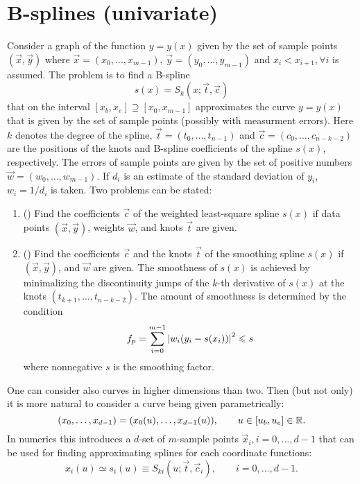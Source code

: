 

\section{B-splines (univariate)}
\label{sec:fitpack}

Consider a graph of the function $y=y(x)$ given by the set of sample
points $(\vec x,\vec y)$ where $\vec x=(x_0,\ldots,x_{m-1})$, $\vec 
y=(y_0,\ldots,y_{m-1})$ and $x_i<x_{i+1}, \forall i$ is assumed.
The problem is to find a B-spline
\begin{displaymath}
  s(x)=S_k(x;\vec t,\vec c)
\end{displaymath}
that on the interval $[x_b,x_e]\supseteq [x_0,x_{m-1}]$ approximates
the curve $y=y(x)$ that is given by the set of sample points (possibly
with measurment errors).  Here $k$ denotes the degree of the spline,
$\vec t=(t_0,\ldots,t_{n-1})$ and $\vec c=(c_0,\ldots,c_{n-k-2})$ are
the positions of the knots and B-spline coefficients of the spline
$s(x)$, respectively. The errors of sample points are given by the set
of positive numbers $\vec w=(w_0,\ldots,w_{m-1})$. If $d_i$ is an
estimate of the standard deviation of $y_i$, $w_i=1/d_i$ is taken.
Two problems can be stated:
\begin{enumerate}
\item () Find the coefficients $\vec c$ of the weighted
  least-square spline $s(x)$ if data points $(\vec x,\vec y)$, weights
  $\vec w$, and knots $\vec t$ are given.
\item () Find the coefficients $\vec c$ and the knots
  $\vec t$ of the smoothing spline $s(x)$ if $(\vec x,\vec y)$, and
  $\vec w$ are given. The smoothness of $s(x)$ is achieved by
  minimalizing the discontinuity jumps of the $k$-th derivative of
  $s(x)$ at the knots $(t_{k+1},\ldots,t_{n-k-2})$. The amount of
  smoothness is determined by the condition
  \begin{displaymath}
    f_p=\sum_{i=0}^{m-1}\left|{w_i(y_i-s(x_i))}\right|^2\leqslant s
  \end{displaymath}
  where nonnegative $s$ is the smoothing factor.
\end{enumerate}

One can consider also curves in higher dimensions than two. Then (but
not only) it is more natural to consider a curve being given
parametrically:
\begin{displaymath}
  (x_0,\ldots,x_{d-1})=(x_0(u),\ldots,x_{d-1}(u)),\qquad u\in[u_b,u_e]\in\mathbb{R}.
\end{displaymath}
In numerics this introduces a $d$-set of $m$-sample points $\vec
x_i,i=0,\ldots,d-1$ that can be used for finding approximating splines
for each coordinate functions:
\begin{displaymath}
 x_i(u)\simeq s_i(u)\equiv S_{ki}(u;\vec t,\vec c_i),\qquad i=0,\ldots,d-1. 
\end{displaymath}


